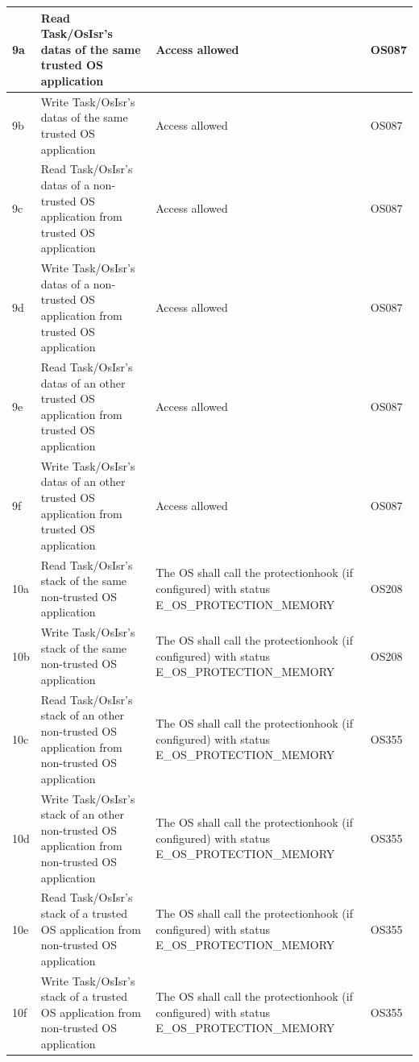 \documentclass[10pt]{article}
\newlength{\Li}\settowidth{\Li}{Case}
\newlength{\Lii}\setlength{\Lii}{7cm}
\newlength{\Liii}\setlength{\Liii}{\textwidth} \addtolength{\Liii}{-\Li} \addtolength{\Liii}{-\Lii}
\newlength{\Liiii}\setlength{\Liiii}{\textwidth} \addtolength{\Liiii}{-\Li}
\begin{document}
\begin{supertabular}{|p{\Li}|p{\Lii}|p{\Liii}|p{\Liiii}|}
	9a	& Read Task/OsIsr's datas of the same trusted OS application 				& Access allowed 									& OS087 \\ \hline
	9b	& Write Task/OsIsr's datas of the same trusted OS application 				& Access allowed 									& OS087 \\ \hline
	9c	& Read Task/OsIsr's datas of a non-trusted OS application from trusted OS application		& Access allowed 									& OS087 \\ \hline
	9d	& Write Task/OsIsr's datas of a non-trusted OS application from trusted OS application		& Access allowed 									& OS087 \\ \hline
	9e	& Read Task/OsIsr's datas of an other trusted OS application from trusted OS application		& Access allowed 									& OS087 \\ \hline
	9f	& Write Task/OsIsr's datas of an other trusted OS application from trusted OS application		& Access allowed 									& OS087 \\ \hline
		
	10a	& Read Task/OsIsr's stack of the same non-trusted OS application 			& The OS shall call the protectionhook (if configured) with status E\_OS\_PROTECTION\_MEMORY	& OS208 \\ \hline
	10b	& Write Task/OsIsr's stack of the same non-trusted OS application 			& The OS shall call the protectionhook (if configured) with status E\_OS\_PROTECTION\_MEMORY	& OS208 \\ \hline
	10c	& Read Task/OsIsr's stack of an other non-trusted OS application from non-trusted OS application		& The OS shall call the protectionhook (if configured) with status E\_OS\_PROTECTION\_MEMORY	& OS355 \\ \hline
	10d	& Write Task/OsIsr's stack of an other non-trusted OS application from non-trusted OS application		& The OS shall call the protectionhook (if configured) with status E\_OS\_PROTECTION\_MEMORY	& OS355 \\ \hline
	10e	& Read Task/OsIsr's stack of a trusted OS application from non-trusted OS application				& The OS shall call the protectionhook (if configured) with status E\_OS\_PROTECTION\_MEMORY	& OS355 \\ \hline
	10f	& Write Task/OsIsr's stack of a trusted OS application from non-trusted OS application				& The OS shall call the protectionhook (if configured) with status E\_OS\_PROTECTION\_MEMORY	& OS355 \\ \hline
	

\end{supertabular}
\end{document}
